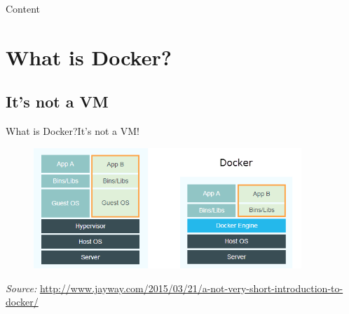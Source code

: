 \documentclass[10pt]{beamer}
\begin{document}
\begin{frame}{Content}{}
	\vspace{0.15cm} %
	\tableofcontents
\end{frame}

\section{What is Docker?}
\subsection{It's not a VM}
\begin{frame}{What is Docker?}{It's not a VM!}
	\begin{figure}[h!]
		\centering
		\includegraphics[width=0.9\textwidth]{images/vm-vs-docker.png}
	\end{figure}
	
	\vspace{1cm}
	\scriptsize{\textit{Source:} \url{http://www.jayway.com/2015/03/21/a-not-very-short-introduction-to-docker/}}
\end{frame}
\end{document}
